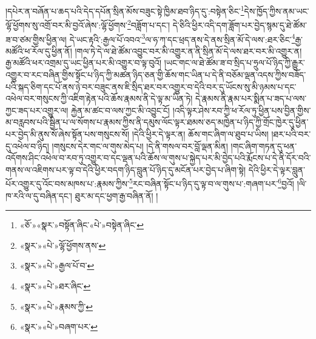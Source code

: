 །དཔེར་ན་བཞོན་པ་ཆད་པའི་དེད་དཔོན་སྲིན་མོས་བཟུང་སྟེ་ཁྱིམ་ཐབ་ཉིད་དུ་:བསྟེན་ཅིང་\footnote{«ཅོ་»«སྣར་»བསྟོན་ཞིང་«པེ་»བསྟེན་ཞིང་}དེས་ཁྱོད་ཀྱིས་ནམ་ཡང་ལྷོ་ཕྱོགས་སུ་འགྲོ་བར་མི་བྱའོ་ཞེས་:ལྷོ་ཕྱོགས་\footnote{«སྣར་»«པེ་»ལྷོ་ཕྱོགས་ནས་}བཟློག་པ་དང་། དེ་ཅིའི་ཕྱིར་འདི་དག་ཟློག་པར་བྱེད་སྙམ་དུ་ཐེ་ཚོམ་ཟ་བ་ཙམ་གྱིས་ཕྱིན་ལ། དེ་ཡང་རྟའི་:རྒྱལ་པོ་འབའ་\footnote{«སྣར་»«པེ་»རྒྱལ་པོ་བ་}ལ་ཧ་ཀ་དང་ཕྲད་ནས་དེ་ནས་སྲིན་མོ་དེ་ལས་:ཐར་ཅིང་\footnote{«སྣར་»«པེ་»ཐར་ཞིང་}རྒྱ་མཚོའི་ཕ་རོལ་དུ་ཕྱིན་ནོ། །གལ་ཏེ་དེ་ལ་ཐེ་ཚོམ་འབྱུང་བར་མི་འགྱུར་ན་ནི་སྲིན་མོ་དེ་ལས་ཐར་བར་མི་འགྱུར་ན། རྒྱ་མཚོའི་ཕར་འགྲམ་དུ་ཡང་ཕྱིན་པར་མི་འགྱུར་བ་ལྟ་བུའོ། །ཡང་གང་ལ་ཐེ་ཚོམ་ཟ་བ་སྲིད་པ་ཧྲུལ་པོ་ཉིད་ཀྱི་རྒྱུར་འགྱུར་བ་རང་བཞིན་གྱིས་སྟོང་པ་ཉིད་ཀྱི་མཚན་ཉིད་ཅན་གྱི་ཆོས་གང་ཡིན་པ་དེ་ནི་བཅོམ་ལྡན་འདས་ཀྱིས་བཟོད་པའི་སྐད་ཅིག་དང་པོ་ནས་ཉེ་བར་བཟུང་ནས་ཇི་སྲིད་ཐར་བར་འགྱུར་བ་དེའི་བར་དུ་ཡོངས་སུ་མི་ཉམས་པ་དང་འཕེལ་བར་གསུངས་ཀྱི་འཇིག་རྟེན་པའི་ཆོས་རྣམས་ནི་དེ་ལྟ་མ་ཡིན་ཏེ། དེ་རྣམས་ནི་རྣམ་པར་སྨིན་པ་ཟད་པ་ལས་ཀྱང་ཟད་པར་འགྱུར་ལ། རྐྱེན་མ་ཚང་བ་ལས་ཀྱང་མི་འབྱུང་ངོ། །འདི་ལྟར་ཤེས་རབ་ཀྱི་ཕ་རོལ་ཏུ་ཕྱིན་པས་བྱིན་གྱིས་མ་བརླབས་པའི་སྦྱིན་པ་ལ་སོགས་པ་རྣམས་ཀྱིས་ནི་དམུས་ལོང་ལྟར་ཐམས་ཅད་མཁྱེན་པ་ཉིད་ཀྱི་གྲོང་ཁྱེར་དུ་ཕྱིན་པར་བྱེད་མི་ནུས་སོ་ཞེས་སྟོན་པས་གསུངས་སོ། །དེའི་ཕྱིར་དེ་ལྟར་ན། ཆོས་གང་ཞིག་ལ་ཐུབ་པ་ཡིས། །ཐར་པའི་བར་དུ་འཕེལ་བ་ཉིད། །གསུངས་དེར་གང་ལ་གུས་མེད་པ། །དེ་ནི་གསལ་བར་བློ་ལྡན་མིན། །གང་ཞིག་གཏན་དུ་ཕན་འདོགས་ཤིང་འཕེལ་བ་རབ་ཏུ་འགྱུར་བ་དང་ལྡན་པའི་ཆོས་ལ་གུས་པ་སྐྱེད་པར་མི་བྱེད་པའི་རྨོངས་པ་དེ་ནི་དོར་བའི་གནས་ལ་འཇིགས་པར་ལྟ་བ་དེའི་ཕྱིར་བདག་ཉིད་བླུན་པོ་ཉིད་དུ་མངོན་པར་བྱེད་པ་ཞིག་སྟེ། དེའི་ཕྱིར་དེ་ལྟར་བླུན་པོར་འགྱུར་དུ་འོང་བས་མཁས་པ་:རྣམས་ཀྱིས་\footnote{«སྣར་»«པེ་»རྣམས་ཀྱི་}རང་བཞིན་སྟོང་པ་ཉིད་དུ་ལྟ་བ་ལ་གུས་པ་:གཞག་པར་\footnote{«སྣར་»«པེ་»བཞག་པར་}བྱའོ། །ལི་ཁ་རའི་ལ་དུ་བཞིན་དང་། ཐུར་མ་དང་ཕྱག་རྒྱ་བཞིན་ནོ། །
